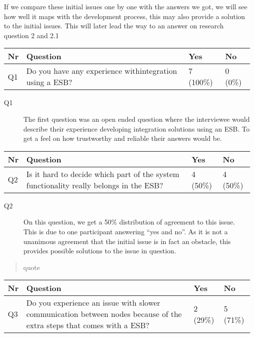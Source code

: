 \documentclass{llncs}
\begin{document}
If we compare these initial issues one by one with the answers we got, we will see how well it maps with the development process, this may also provide a solution to the initial issues. This will later lead the way to an answer on research question 2 and 2.1

\begin{tabular}{ | l | p{9cm} | l | l |}
\hline
Nr & Question & Yes & No \\ \hline
Q1 & Do you have any experience withintegration using a ESB? & 7 (100\%) & 0 (0\%) \\ \hline
\end{tabular}

\begin{description}
\item[Q1] The first question was an open ended question where the interviewee would describe their experience developing integration solutions using an ESB. To get a feel on how trustworthy and reliable their answers would be.
\end{description}

\begin{tabular}{ | l | p{9cm} | l | l |}
\hline
Nr & Question & Yes & No \\ \hline
Q2 & Is it hard to decide which part of the system functionality really belongs in the ESB? & 4 (50\%) & 4 (50\%)\\ \hline
\end{tabular}

\begin{description}
\item[Q2] On this question, we get a 50\% distribution of agreement to this issue. This is due to one participant answering “yes and no”. As it is not a unanimous agreement that the initial issue is in fact an obstacle, this provides possible solutions to the issue in question.
\end{description}

\begin{quote}
  quote
\end{quote}

\begin{tabular}{ | l | p{9cm} | l | l |}
\hline
Nr & Question & Yes & No \\ \hline
Q3 & Do you experience an issue with slower communication between nodes because of the extra steps that comes with a ESB? & 2 (29\%) & 5 (71\%) \\ \hline
\end{tabular}
\end{document}
